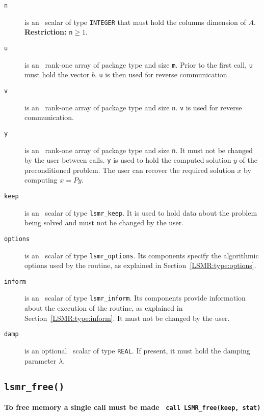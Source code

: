 \begin{description}
\item[\texttt{n}] is an \intentin\ scalar of type {\tt INTEGER} that must hold 
the columns dimension of $A$.  {\bf Restriction:} {\tt n}$ \ge 1$.

\item[\texttt{u}] is an \intentinout\ rank-one array of package type 
and size {\tt m}. Prior to the first call, {\tt u} must hold the vector $b$.
{\tt u} is then used for reverse communication.

\item[\texttt{v}] is an \intentinout\ rank-one array of package type 
and size {\tt n}. {\tt v} is used for reverse communication.


\item[\texttt{y}] is an \intentinout\ rank-one array of package type 
and size {\tt n}. It must not be changed by the user between calls.
{\tt y} is used to hold the computed solution $y$ of the preconditioned problem.
The user can recover the required solution $x$ by computing $x = Py$.

\item[\texttt{keep}] is an \intentinout\ scalar of type
{\tt lsmr\_keep}. It is used to hold data about the problem being
solved and must not be changed by the user.

\item[\texttt{options}] is an \intentin\ scalar of type {\tt lsmr\_options}.
Its components specify the algorithmic options used by the routine, as
explained in Section~\ref{LSMR:type:options}.

\item[\texttt{inform}] is an \intentinout\ scalar of type
{\tt lsmr\_inform}. Its components provide information about the execution
of the routine, as explained in Section~\ref{LSMR:type:inform}.
It must not be changed by the user.

\item[\texttt{damp}] is an optional \intentin\ scalar of type
{\tt REAL}. If present, it must hold the damping parameter $\lambda$.

\end{description}



\subsection{\texttt{lsmr\_free()}}
\textbf{To free memory a single call must be made
   \vspace{0.2cm}
    \texttt{ \hspace*{0.2cm}
      call LSMR\_free(keep, stat)
   }
}
\vspace{0.2cm}


